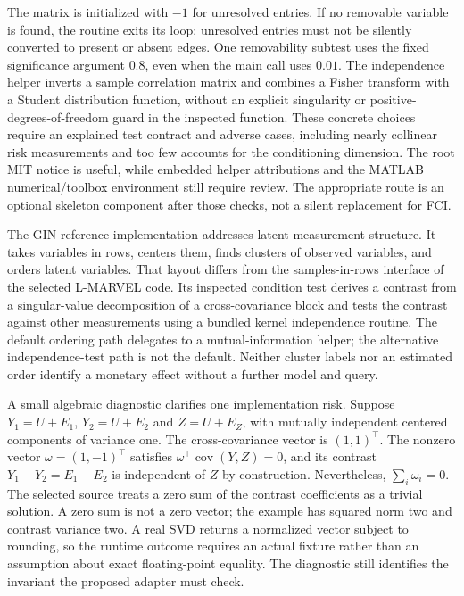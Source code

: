 The matrix is initialized with \(-1\) for unresolved entries. If no
removable variable is found, the routine exits its loop; unresolved
entries must not be silently converted to present or absent edges. One
removability subtest uses the fixed significance argument \(0.8\), even
when the main call uses \(0.01\). The independence helper inverts a
sample correlation matrix and combines a Fisher transform with a Student
distribution function, without an explicit singularity or
positive-degrees-of-freedom guard in the inspected function. These
concrete choices require an explained test contract and adverse cases,
including nearly collinear risk measurements and too few accounts for
the conditioning dimension. The root MIT notice is useful, while
embedded helper attributions and the MATLAB numerical/toolbox
environment still require review. The appropriate route is an optional
skeleton component after those checks, not a silent replacement for FCI.
\citep{exec14_olatent_lmarvel}

The GIN reference implementation addresses latent measurement structure.
It takes variables in rows, centers them, finds clusters of observed
variables, and orders latent variables. That layout differs from the
samples-in-rows interface of the selected L-MARVEL code. Its inspected
condition test derives a contrast from a singular-value decomposition of
a cross-covariance block and tests the contrast against other
measurements using a bundled kernel independence routine. The default
ordering path delegates to a mutual-information helper; the alternative
independence-test path is not the default. Neither cluster labels nor an
estimated order identify a monetary effect without a further model and
query. \citep{exec14_olatent_gin}

A small algebraic diagnostic clarifies one implementation risk. Suppose
\(Y_1=U+E_1\), \(Y_2=U+E_2\) and \(Z=U+E_Z\), with mutually independent
centered components of variance one. The cross-covariance vector is
\((1,1)^\top\). The nonzero vector \(\omega=(1,-1)^\top\) satisfies
\(\omega^\top\operatorname{cov}(Y,Z)=0\), and its contrast
\(Y_1-Y_2=E_1-E_2\) is independent of \(Z\) by construction.
Nevertheless, \(\sum_i\omega_i=0\). The selected source treats a zero
sum of the contrast coefficients as a trivial solution. A zero sum is
not a zero vector; the example has squared norm two and contrast
variance two. A real SVD returns a normalized vector subject to
rounding, so the runtime outcome requires an actual fixture rather than
an assumption about exact floating-point equality. The diagnostic still
identifies the invariant the proposed adapter must check.
\citep{exec14_olatent_gin,exec14_olatent_oracle}

